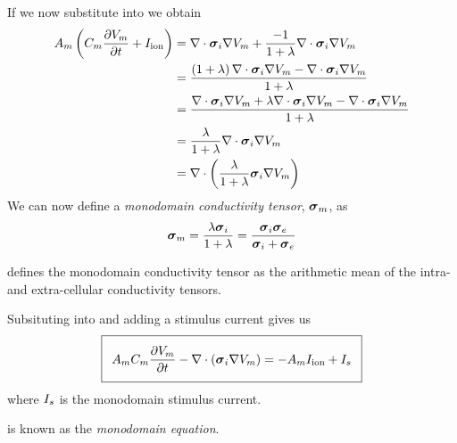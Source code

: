 If we now substitute  into  we obtain
\begin{equation}
  \begin{aligned}
    \membraneareavolumeratio\pbrac{\membranecapacitance\delby{\transmembranevoltage}{t}+\ioniccurrent}&=
    \divergence{}{\intracellularconductivitytensor\gradient{}{\transmembranevoltage}} +
    \dfrac{-1}{1+\lambda}\divergence{}{\intracellularconductivitytensor\gradient{}{\transmembranevoltage}} \\
    &=\dfrac{\pbrac{1+\lambda}\divergence{}{\intracellularconductivitytensor\gradient{}{\transmembranevoltage}} -
      \divergence{}{\intracellularconductivitytensor\gradient{}{\transmembranevoltage}}}{1+\lambda} \\
    &=\dfrac{\divergence{}{\intracellularconductivitytensor\gradient{}{\transmembranevoltage}}+
      \lambda\divergence{}{\intracellularconductivitytensor\gradient{}{\transmembranevoltage}} -
      \divergence{}{\intracellularconductivitytensor\gradient{}{\transmembranevoltage}}}{1+\lambda} \\
    &=\dfrac{\lambda}{1+\lambda}\divergence{}{\intracellularconductivitytensor\gradient{}{\transmembranevoltage}}\\
    &=\divergence{}{\pbrac{\dfrac{\lambda}{1+\lambda}\intracellularconductivitytensor\gradient{}{\transmembranevoltage}}}
  \end{aligned}
\end{equation}
We can now define a \emph{monodomain conductivity tensor}, $ { \boldsymbol{\mathit{ \sigma }} }_{m} $, as
\begin{equation}
  \monodomainconductivitytensor=\dfrac{\lambda\intracellularconductivitytensor}{1+\lambda}=
  \dfrac{\intracellularconductivitytensor\extracellularconductivitytensor}{\intracellularconductivitytensor+
    \extracellularconductivitytensor}
  \label{eqn:MonodomainConductivityTensor}  
\end{equation}

 defines the monodomain
conductivity tensor as the arithmetic mean of the intra- and
extra-cellular conductivity tensors.

Subsituting  into
 and adding a stimulus current
gives us
\begin{equation}
  \addtolength{\fboxsep}{5pt}
  \boxed{
    \membraneareavolumeratio\membranecapacitance\delby{\transmembranevoltage}{t}-
    \divergence{}{\pbrac{\tensor{\sigma}_{i}\grad{\transmembranevoltage}}}=
    -\membraneareavolumeratio\ioniccurrent+\stimuluscurrent
  }
  \label{eqn:MonodomainEquation}
\end{equation}
where $ { I }_{s} $ is the monodomain stimulus current.

 is known as the \emph{monodomain equation}.
